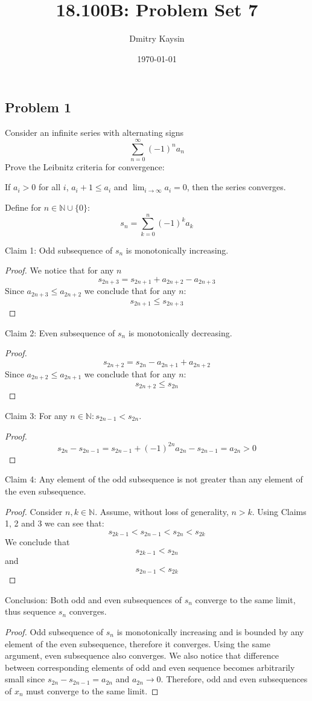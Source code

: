 \documentclass{article}
\title{18.100B: Problem Set 7}
\author{Dmitry Kaysin}
\date\today
\begin{document}
\maketitle 

\subsection*{Problem 1}

\begin{tcolorbox}
Consider an infinite series with alternating signs
$$ \sum_{n=0}^\infty (-1)^n a_n $$
Prove the Leibnitz criteria for convergence:

If $a_i > 0$ for all $i$, $a_i+1 \leq a_i$ and $\lim_{i \to \infty} a_i = 0$, then the series converges.
\end{tcolorbox}

Define for $n \in \mathbb{N} \cup \{0\}$:
$$ s_n = \sum_{k=0}^{n} (-1)^k a_k $$

Claim 1: Odd subsequence of $s_n$ is monotonically increasing.
\begin{proof}
We notice that for any $n$
$$ s_{2n+3} = s_{2n+1} + a_{2n+2} - a_{2n+3} $$
Since $a_{2n+3} \leq a_{2n+2}$ we conclude that for any $n$:
$$ s_{2n+1} \leq s_{2n+3} $$
\end{proof}

Claim 2: Even subsequence of $s_n$ is monotonically decreasing.
\begin{proof}
$$ s_{2n+2} = s_{2n} - a_{2n+1} + a_{2n+2} $$
Since $a_{2n+2} \leq a_{2n+1}$ we conclude that for any $n$:
$$ s_{2n+2} \leq s_{2n} $$
\end{proof}

Claim 3: For any $n \in \mathbb{N} : s_{2n-1} < s_{2n}$.
\begin{proof}
$$ s_{2n} - s_{2n-1} = s_{2n-1} + (-1)^{2n} a_{2n} - s_{2n-1} = a_{2n} > 0 $$
\end{proof}

Claim 4: Any element of the odd subsequence is not greater than any element of the even subsequence.
\begin{proof}
Consider $n, k \in \mathbb{N}$. Assume, without loss of generality, $n > k$.
Using Claims 1, 2 and 3 we can see that:
$$ s_{2k-1} < s_{2n-1} < s_{2n} < s_{2k} $$
We conclude that
$$ s_{2k-1} < s_{2n} $$
and
$$ s_{2n-1} < s_{2k} $$
\end{proof}

Conclusion: Both odd and even subsequences of $s_n$ converge to the same limit, thus sequence $s_n$ converges.
\begin{proof}
Odd subsequence of $s_n$ is monotonically increasing and is bounded by any element of the even subsequence, therefore it converges. Using the same argument, even subsequence also converges.
We also notice that difference between corresponding elements of odd and even sequence becomes arbitrarily small since $s_{2n} - s_{2n-1} = a_{2n}$ and $a_{2n} \to 0$. Therefore, odd and even subsequences of $x_n$ must converge to the same limit.
\end{proof}
\end{document}
